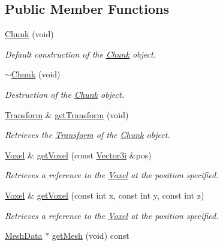 \subsection*{Public Member Functions}
\begin{DoxyCompactItemize}
\item 
\hyperlink{classsparky_1_1_chunk_aa97fa2698af88d0016dd530fb15b7058}{Chunk} (void)
\begin{DoxyCompactList}\small\item\em Default construction of the \hyperlink{classsparky_1_1_chunk}{Chunk} object. \end{DoxyCompactList}\item 
\hyperlink{classsparky_1_1_chunk_abffb3a373d72632f02bed7be42cd2cd7}{$\sim$\+Chunk} (void)
\begin{DoxyCompactList}\small\item\em Destruction of the \hyperlink{classsparky_1_1_chunk}{Chunk} object. \end{DoxyCompactList}\item 
\hyperlink{classsparky_1_1_transform}{Transform} \& \hyperlink{classsparky_1_1_chunk_afff0bec815828d5fba3523ef85c1083f}{get\+Transform} (void)
\begin{DoxyCompactList}\small\item\em Retrieves the \hyperlink{classsparky_1_1_transform}{Transform} of the \hyperlink{classsparky_1_1_chunk}{Chunk} object. \end{DoxyCompactList}\item 
\hyperlink{classsparky_1_1_voxel}{Voxel} \& \hyperlink{classsparky_1_1_chunk_a60e338dc27c287349dc967e8f10d7a51}{get\+Voxel} (const \hyperlink{classsparky_1_1_vector3}{Vector3i} \&pos)
\begin{DoxyCompactList}\small\item\em Retrieves a reference to the \hyperlink{classsparky_1_1_voxel}{Voxel} at the position specified. \end{DoxyCompactList}\item 
\hyperlink{classsparky_1_1_voxel}{Voxel} \& \hyperlink{classsparky_1_1_chunk_a613cf927b99cc6892cb5034859b3083f}{get\+Voxel} (const int x, const int y, const int z)
\begin{DoxyCompactList}\small\item\em Retrieves a reference to the \hyperlink{classsparky_1_1_voxel}{Voxel} at the position specified. \end{DoxyCompactList}\item 
\hyperlink{classsparky_1_1_mesh_data}{Mesh\+Data} $\ast$ \hyperlink{classsparky_1_1_chunk_aec95749745f482ae6aca2a813cd1b420}{get\+Mesh} (void) const 

\end{DoxyCompactItemize}
